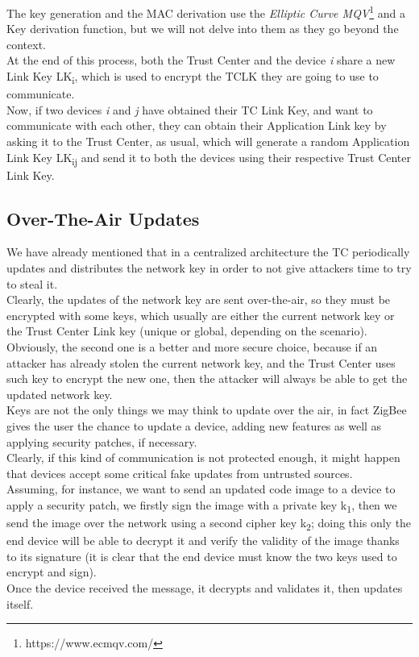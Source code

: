 \documentclass[12pt]{report}
\begin{document}
{The key generation and the MAC derivation use the \emph{Elliptic Curve MQV}\footnote{https://www.ecmqv.com/} and a Key derivation function, but we will not delve into them as they go beyond the context.\\
At the end of this process, both the Trust Center and the device \emph{i} share a new Link Key LK\textsubscript{i}, which is used to encrypt the TCLK they are going to use to communicate.\\
Now, if two devices \emph{i} and \emph{j} have obtained their TC Link Key, and want to communicate with each other, they can obtain their Application Link key by asking it to the Trust Center, as usual, which will generate a random Application Link Key LK\textsubscript{ij} and send it to both the devices using their respective Trust Center Link Key.\\

\subsection{Over-The-Air Updates}
\bigskip
We have already mentioned that in a centralized architecture the TC periodically updates and distributes the network key in order to not give attackers time to try to steal it.\\
Clearly, the updates of the network key are sent over-the-air, so they must be encrypted with some keys, which usually are either the current network key or the Trust Center Link key (unique or global, depending on the scenario).\\
Obviously, the second one is a better and more secure choice, because if an attacker has already stolen the current network key, and the Trust Center uses such key to encrypt the new one, then the attacker will always be able to get the updated network key.\\

Keys are not the only things we may think to update over the air, in fact ZigBee gives the user the chance to update a device, adding new features as well as applying security patches, if necessary.\\
Clearly, if this kind of communication is not protected enough, it might happen that devices accept some critical fake updates from untrusted sources.\\
Assuming, for instance, we want to send an updated code image to a device to apply a security patch, we firstly sign the image with a private key k\textsubscript{1}, then we send the image over the network using a second cipher key k\textsubscript{2}; doing this only the end device will be able to decrypt it and verify the validity of the image thanks to its signature (it is clear that the end device must know the two keys used to encrypt and sign).\\
Once the device received the message, it decrypts and validates it, then updates itself.\\

}
\end{document}
